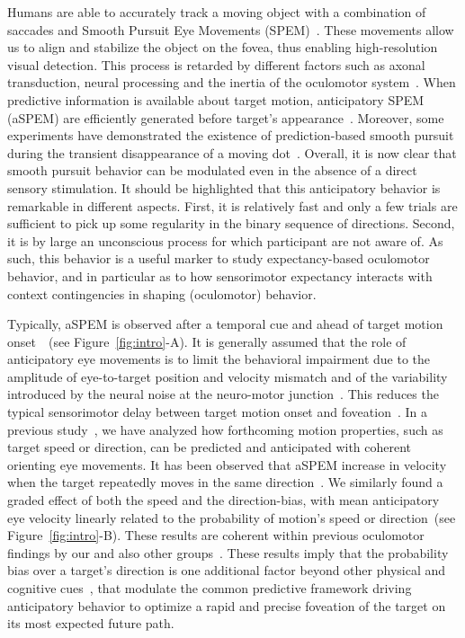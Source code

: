 \documentclass[profile,final,english,draft]{article}%
\newcommand{\citep}[1]{\parencite{#1}}
\newcommand{\seeFig}[1]{Figure~\ref{fig:#1}}
\begin{document}
Humans are able to accurately track a moving object
with a combination of saccades and
Smooth Pursuit Eye Movements (SPEM)~\citep{ref}.
These movements allow us to align and
stabilize the object on the fovea,
thus enabling high-resolution visual detection.
This process is retarded by different factors such as axonal transduction,
neural processing and the inertia of the oculomotor system~\citep{Krauzlis}.
When predictive information is available about target motion,
anticipatory SPEM (aSPEM) are
efficiently generated before target's appearance~\citep{Westheimer1954, Kowler1979a, Kowler1979b}.
Moreover, some experiments have demonstrated the existence
of prediction-based smooth pursuit during
the transient disappearance of a moving dot~\citep{Badler2006,BeckerFuchs1985}.
Overall, it is now clear that smooth pursuit behavior
can be modulated even in the absence of a direct sensory stimulation.
It should be highlighted that this anticipatory behavior is remarkable
in different aspects.
First, it is relatively fast and only a few trials are sufficient
to pick up some regularity in the binary sequence of directions.
Second, it is by large an unconscious process
for which participant are not aware of.
As such, this behavior is a useful marker
to study expectancy-based oculomotor behavior,
and in particular as to how sensorimotor expectancy interacts
with context contingencies in shaping (oculomotor) behavior.

Typically, aSPEM is observed after a temporal cue and
ahead of target motion onset~\citep{Kowler1979a,Kowler1979b, Kowler1984}~(see \seeFig{intro}-A).
It is generally assumed that the role of anticipatory eye movements is
to limit the behavioral impairment due
to the amplitude of eye-to-target position and velocity mismatch and
of the variability introduced by the neural noise
at the neuro-motor junction~\citep{WolpertXXX}.
This reduces the typical sensorimotor delay
between target motion onset and foveation~\citep{PerrinetAdamasFriston2014}.
In a previous study~\citep{Montagnini2010},
we have analyzed how forthcoming motion properties,
such as target speed or direction, can be
predicted and anticipated with coherent orienting eye movements.
It has been observed that aSPEM increase in velocity
when the target repeatedly moves in the same direction~\citep{Kowler1984, Kowler1989, Heinen2005}.
We similarly found a graded effect of both the speed and the direction-bias,
with mean anticipatory eye velocity
linearly related to the probability of motion's speed or direction~(see \seeFig{intro}-B).
These results are coherent within previous oculomotor findings
by our and also other groups~\citep{SantosKowler2017}.
These results imply that the probability bias over a target's direction is
one additional factor beyond other physical and cognitive cues~\citep{Kowler2014, SantosKowler2017},
that modulate the common predictive framework
driving anticipatory behavior to optimize a rapid and
precise foveation of the target on its most expected future path.
\end{document}
